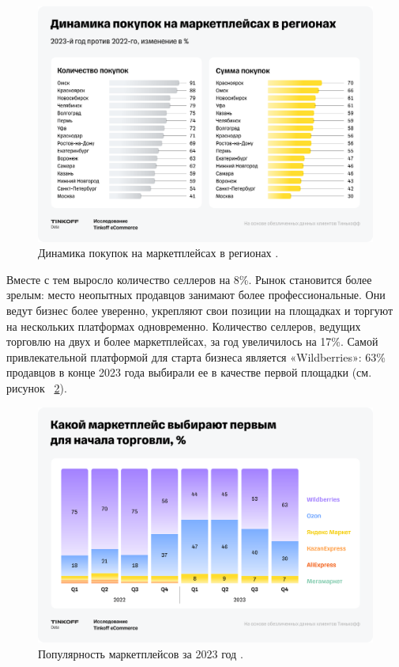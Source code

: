 \documentclass[a4paper,12pt]{extarticle}
\begin{document}
\begin{figure}[hbtp]
	\centering
	\includegraphics[scale=0.3]{marketplaces-regions.png}
	\caption{Динамика покупок на маркетплейсах в регионах \cite{tinkoff-research}.}
	\label{fig:marketplaces-regions}
\end{figure}  

Вместе с тем выросло количество селлеров на 8\%. Рынок становится более зрелым: место неопытных продавцов занимают более профессиональные. Они ведут бизнес более уверенно, укрепляют свои позиции на площадках и торгуют на нескольких платформах одновременно. Количество селлеров, ведущих торговлю на двух и более маркетплейсах, за год увеличилось на 17\%. Самой привлекательной платформой для старта бизнеса является «Wildberries»: 63\% продавцов в конце 2023 года выбирали ее в качестве первой площадки (см. рисунок ~\ref{fig:marketplaces-top}).

\begin{figure}[hbtp]
	\centering
	\includegraphics[scale=0.3]{marketplaces-top.png}
	\caption{Популярность маркетплейсов за 2023 год \cite{tinkoff-research}.}
	\label{fig:marketplaces-top}
\end{figure} 
\end{document}
